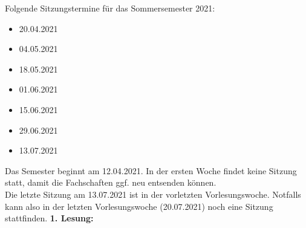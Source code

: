 {
	Folgende Sitzungstermine für das Sommersemester 2021:
	\begin{itemize}
		\item 20.04.2021
		\item 04.05.2021
		\item 18.05.2021
		\item 01.06.2021
		\item 15.06.2021
		\item 29.06.2021
		\item 13.07.2021
	\end{itemize}
}{
	Das Semester beginnt am 12.04.2021. In der ersten Woche findet keine Sitzung statt, damit die Fachschaften ggf. neu entsenden können.\\
	Die letzte Sitzung am 13.07.2021 ist in der vorletzten Vorlesungswoche. Notfalls kann also in der letzten Vorlesungswoche (20.07.2021) noch eine Sitzung stattfinden.
}{
	\textbf{1. Lesung:}
    \ul{}
}{
}
